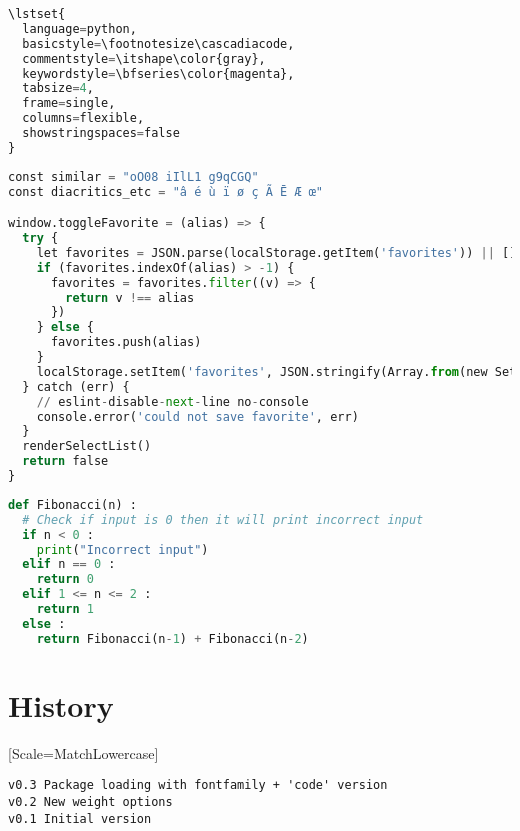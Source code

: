 \documentclass{article}
\begin{document}
\begin{lstlisting}[language=python,basicstyle=\footnotesize\cascadiacode,commentstyle=\itshape\color{gray},keywordstyle=\bfseries\color{magenta},tabsize=4,frame=single,columns=flexible,showstringspaces=false]
\lstset{
  language=python,
  basicstyle=\footnotesize\cascadiacode,
  commentstyle=\itshape\color{gray},
  keywordstyle=\bfseries\color{magenta},
  tabsize=4,
  frame=single,
  columns=flexible,
  showstringspaces=false
}
\end{lstlisting}
\begin{lstlisting}[language=python,basicstyle=\footnotesize\cascadiacode,commentstyle=\itshape\color{gray},keywordstyle=\bfseries\color{magenta},tabsize=4,frame=single,columns=flexible,showstringspaces=false]
const similar = "oO08 iIlL1 g9qCGQ"
const diacritics_etc = "â é ù ï ø ç Ã Ē Æ œ"

window.toggleFavorite = (alias) => {
  try {
    let favorites = JSON.parse(localStorage.getItem('favorites')) || []
    if (favorites.indexOf(alias) > -1) {
      favorites = favorites.filter((v) => {
        return v !== alias
      })
    } else {
      favorites.push(alias)
    }
    localStorage.setItem('favorites', JSON.stringify(Array.from(new Set(favorites))))
  } catch (err) {
    // eslint-disable-next-line no-console
    console.error('could not save favorite', err)
  }
  renderSelectList()
  return false
}
\end{lstlisting}

\begin{lstlisting}[language=python,basicstyle=\footnotesize\cascadiacode,commentstyle=\itshape\color{gray},keywordstyle=\bfseries\color{magenta},tabsize=4,frame=single,columns=flexible,showstringspaces=false]
def Fibonacci(n) :
  # Check if input is 0 then it will print incorrect input
  if n < 0 :
    print("Incorrect input")
  elif n == 0 :
    return 0
  elif 1 <= n <= 2 :
    return 1
  else :
    return Fibonacci(n-1) + Fibonacci(n-2)
\end{lstlisting}

\pagebreak


\section{History}

\setmonofont{CMU Typewriter Text}[Scale=MatchLowercase]

\begin{verbatim}
v0.3 Package loading with fontfamily + 'code' version
v0.2 New weight options
v0.1 Initial version
\end{verbatim}
\end{document}
